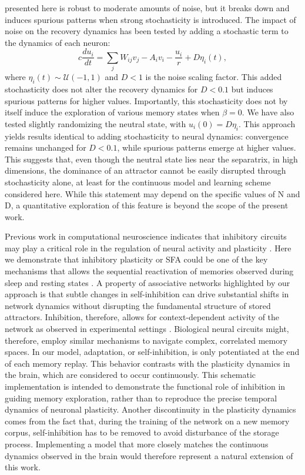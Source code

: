 \documentclass[10pt,letterpaper]{article}
\begin{document}
presented here is robust to moderate amounts of noise, but it breaks down and induces spurious patterns when strong stochasticity is introduced. The impact of noise on the recovery dynamics has been tested by adding a stochastic term to the dynamics of each neuron:
\begin{equation}
\label{eq:CHN_with_shallowing_and_noise}
c\frac{du_i}{dt} = \sum_j W_{ij}v_j - A_iv_i - \frac{u_i}{r} + D\eta_i(t),
\end{equation}
where $\eta_i(t) \sim \mathcal{U}(-1, 1)$ and $D < 1$ is the noise scaling factor. This added stochasticity does not alter the recovery dynamics for $D < 0.1$ but induces spurious patterns for higher values. Importantly, this stochasticity does not by itself induce the exploration of various memory states when $\beta = 0$. We have also tested slightly randomizing the neutral state, with $u_i(0) = D\eta_i$. This approach yields results identical to adding stochasticity to neural dynamics: convergence remains unchanged for $D<0.1$, while spurious patterns emerge at higher values. This suggests that, even though the neutral state lies near the separatrix, in high dimensions, the dominance of an attractor cannot be easily disrupted through stochasticity alone, at least for the continuous model and learning scheme considered here. While this statement may
depend on the specific values of N and D, a quantitative exploration of this feature is beyond the scope of the present work.

Previous work in computational neuroscience indicates that inhibitory circuits may play a critical role in the regulation of neural activity and plasticity \cite{vogels_inhibitory_2011, barron_unmasking_2016}. Here we demonstrate that inhibitory plasticity or SFA could be one of the key mechanisms that allows the sequential reactivation of memories observed during sleep and resting states \cite{wilson_reactivation_1994,peyrache_replay_2009}. A property of associative networks highlighted by our approach is that subtle changes in self-inhibition can drive substantial shifts in network dynamics without disrupting the fundamental structure of stored attractors. Inhibition, therefore, allows for context-dependent activity of the network as observed in experimental settings \cite{kuchibhotla_parallel_2017}.
Biological neural circuits might, therefore, employ similar mechanisms to navigate complex, correlated memory spaces. In our model, adaptation, or self-inhibition, is only potentiated at the end of each memory replay. This behavior contrasts with the plasticity dynamics in the brain, which are considered to occur continuously. This schematic implementation is intended to demonstrate the functional role of inhibition in guiding memory exploration, rather than to reproduce the precise temporal dynamics of neuronal plasticity. Another discontinuity in the plasticity dynamics comes from the fact that, during the training of the network on a new memory corpus, self-inhibition has to be removed to avoid disturbance of the storage process. Implementing a model that more closely matches the continuous dynamics observed in the brain would therefore represent a natural extension of this work. 
\end{document}
